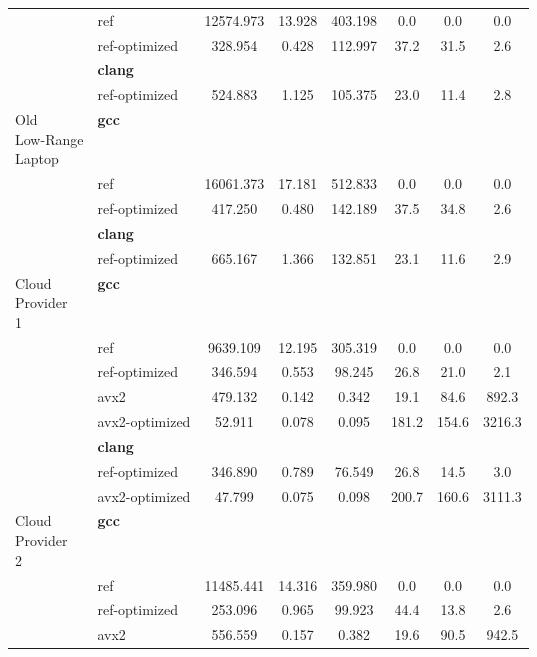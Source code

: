 \begin{table}[H]
\begin{tabularx}{\linewidth}{l l c c c c c c}
          & ref & 12574.973 & 13.928 & 403.198 & 0.0 & 0.0 & 0.0\\
          & ref-optimized & 328.954 & 0.428 & 112.997 & 37.2 & 31.5 & 2.6\\
          & \textbf{clang} & & & & & \\
          & ref-optimized & 524.883 & 1.125 & 105.375 & 23.0 & 11.4 & 2.8\\
          \midrule
          \multirowcell{5}{Old\\ Low-Range\\ Laptop}
          & \textbf{gcc} & & & & & \\
          & ref & 16061.373 & 17.181 & 512.833 & 0.0 & 0.0 & 0.0\\
          & ref-optimized & 417.250 & 0.480 & 142.189 & 37.5 & 34.8 & 2.6\\
          & \textbf{clang} & & & & & \\
          & ref-optimized & 665.167 & 1.366 & 132.851 & 23.1 & 11.6 & 2.9\\
          \midrule
          \multirowcell{8}{Cloud\\ Provider\\ 1}
          & \textbf{gcc} & & & & & \\
          & ref & 9639.109 & 12.195 & 305.319 & 0.0 & 0.0 & 0.0\\
          & ref-optimized & 346.594 & 0.553 & 98.245 & 26.8 & 21.0 & 2.1\\
          & avx2 & 479.132 & 0.142 & 0.342 & 19.1 & 84.6 & 892.3\\
          & avx2-optimized & 52.911 & 0.078 & 0.095 & 181.2 & 154.6 & 3216.3\\
          & \textbf{clang} & & & & & \\
          & ref-optimized & 346.890 & 0.789 & 76.549 & 26.8 & 14.5 & 3.0\\
          & avx2-optimized & 47.799 & 0.075 & 0.098 & 200.7 & 160.6 & 3111.3\\
          \midrule
          \multirowcell{8}{Cloud\\ Provider\\ 2}
          & \textbf{gcc} & & & & & \\
          & ref & 11485.441 & 14.316 & 359.980 & 0.0 & 0.0 & 0.0\\
          & ref-optimized & 253.096 & 0.965 & 99.923 & 44.4 & 13.8 & 2.6\\
          & avx2 & 556.559 & 0.157 & 0.382 & 19.6 & 90.5 & 942.5\\

\end{tabularx}
\end{table}
